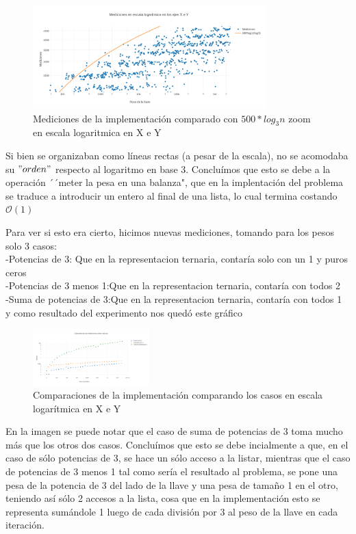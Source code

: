 \documentclass[spanish,12pt]{article}
\begin{document}
{\begin{figure}[H]
\centering
\includegraphics[width=0.8\textwidth]{punto2-zoom}
\caption{Mediciones de la implementaci\'on comparado con $500*log_{3}{n}$ zoom en escala logaritmica en X e Y }
\end{figure}
Si bien se organizaban como líneas rectas (a pesar de la escala), no se acomodaba su $"orden"$ respecto al logaritmo en base 3.
Concluímos que esto se debe a la operación ´´meter la pesa en una balanza", que en la implentación del problema se traduce a introducir un entero al final de una lista, lo cual termina costando $\mathcal{O}(1)$

Para ver si esto era cierto, hicimos nuevas mediciones, tomando para los pesos  solo 3 casos: \\
-Potencias de 3: Que en la representacion ternaria, contaría solo con un 1 y puros ceros \\
-Potencias de 3 menos 1:Que en la representacion ternaria, contaría con todos 2\\
-Suma de potencias de 3:Que en la representacion ternaria, contaría con todos 1\\

y como resultado del experimento nos quedó este gráfico
\begin{figure}[H]
\centering
\includegraphics[width=0.4\textwidth]{punto2-comparaciones}
\caption{Comparaciones de la implementaci\'on comparando los casos en escala logarítmica en X e Y }
\end{figure}

En la imagen se puede notar que el caso de suma de potencias de 3 toma mucho más que los otros dos casos. Concluímos que esto se debe incialmente a que, en el caso de sólo potencias de 3, se hace un sólo acceso a la listar, mientras que el caso de potencias de 3 menos 1
tal como sería el resultado al problema, se pone una pesa de la potencia de 3 del lado de la llave y una pesa de tamaño 1 en el otro, teniendo así sólo 2 accesos a la lista, cosa que en la implementación esto se representa sumándole 1 luego de cada división por 3 al peso de la llave en cada iteración.

}
\end{document}
